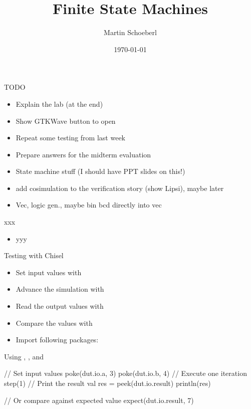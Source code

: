 

\newif\ifbook


\title{Finite State Machines}
\author{Martin Schoeberl}
\date{\today}



\begin{frame}
\titlepage
\end{frame}


\begin{frame}[fragile]{TODO}
\begin{itemize}
\item Explain the lab (at the end)
\item Show GTKWave button to open
\item Repeat some testing from last week
\item Prepare answers for the midterm evaluation
\item State machine stuff (I should have PPT slides on this!)
\item add cosimulation to the verification story (show Lipsi), maybe later
\item Vec, logic gen., maybe bin bcd directly into vec
\end{itemize}
\end{frame}

\begin{frame}[fragile]{xxx}
\begin{itemize}
\item yyy
\end{itemize}
\end{frame}



\begin{frame}[fragile]{Testing with Chisel}
\begin{itemize}
\item Set input values with 
\item Advance the simulation with 
\item Read the output values with 
\item Compare the values with 
\item Import following packages:
\end{itemize}
\end{frame}

\begin{frame}[fragile]{Using , , and }
\begin{chisel}
// Set input values
poke(dut.io.a, 3)
poke(dut.io.b, 4)
// Execute one iteration
step(1)
// Print the result
val res = peek(dut.io.result)
println(res)

// Or compare against expected value
expect(dut.io.result, 7)
\end{chisel}
\end{frame}

